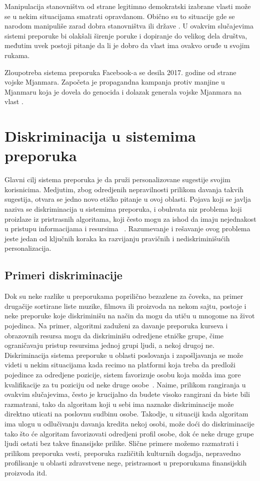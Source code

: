 \documentclass[a4paper]{article}
\begin{document}
Manipulacija stanovništva od strane legitimno demokratski izabrane vlasti može se u nekim situacijama smatrati opravdanom. Obično su to situacije gde se narodom manipuliše zarad dobra stanovništva ili države \cite{Genovesi_Kaesling_Robbins_2023}. U ovakvim slučajevima sistemi preporuke bi olakšali širenje poruke i dopiranje do velikog dela društva, međutim uvek postoji pitanje da li je dobro da vlast ima ovakvo oruđe u svojim rukama.

Zloupotreba sistema preporuka Facebook-a se desila 2017. godine od strane vojske Mjanmara. Započeta je propagandna kampanja protiv manjine u Mjanmaru koja je dovela do genocida i dolazak generala vojske Mjanmara na vlast \cite{Reports_2018}.

\section{Diskriminacija u sistemima preporuka}

Glavni cilj sistema preporuka je da pruži personalizovane sugestije svojim korisnicima. Medjutim, zbog odredjenih nepravilnosti prilikom davanja takvih sugestija, otvara se jedno novo etičko pitanje u ovoj oblasti. Pojava koji se javlja naziva se diskriminacija u sistemima preporuka, i obuhvata niz problema koji proizlaze iz pristrasnih algoritama, koji često mogu za ishod da imaju nejednakost u pristupu informacijama i resursima ~\cite{fairness}. Razumevanje i rešavanje ovog problema jeste jedan od ključnih koraka ka razvijanju pravičnih i nediskriminišućih personalizacija. 
\subsection{Primeri diskriminacije}
Dok su neke razlike u preporukama poprilično bezazlene za čoveka, na primer drugačije sortirane liste muzike, filmova ili proizvoda na nekom sajtu, postoje i neke preporuke koje diskriminišu na način da mogu da utiču u mnogome na život pojedinca. Na primer, algoritmi zaduženi za davanje preporuka kurseva i obrazovnih resursa mogu da diskriminišu odredjene etničke grupe, čime ograničavaju pristup resursima jednoj grupi ljudi, a nekoj drugoj ne. Diskriminacija sistema preporuke u oblasti poslovanja i zapošljavanja se može videti u nekim situacijama kada recimo na platformi koja treba da predloži pojedince za odredjene pozicije, sistem favorizuje osobu koja možda ima gore kvalifikacije za tu poziciju od neke druge osobe~\cite{druga}. Naime, prilikom rangiranja u ovakvim slučajevima, često je krucijalno da budete visoko rangirani da biste bili razmatrani, tako da algoritam koji u sebi ima naznake diskriminacije može direktno uticati na poslovnu sudbinu osobe. Takodje, u situaciji kada algoritam ima ulogu u odlučivanju davanja kredita nekoj osobi, može doći do diskriminacije tako što će algoritam favorizovati odredjeni profil osobe, dok će neke druge grupe ljudi ostati bez takve finansijske prilike. Slične primere možemo razmatrati i prilikom preporuka vesti, preporuka različitih kulturnih dogadja, nepravedno profilisanje u oblasti zdravstvene nege, pristrasnost u preporukama finansijskih proizvoda itd.
\end{document}
